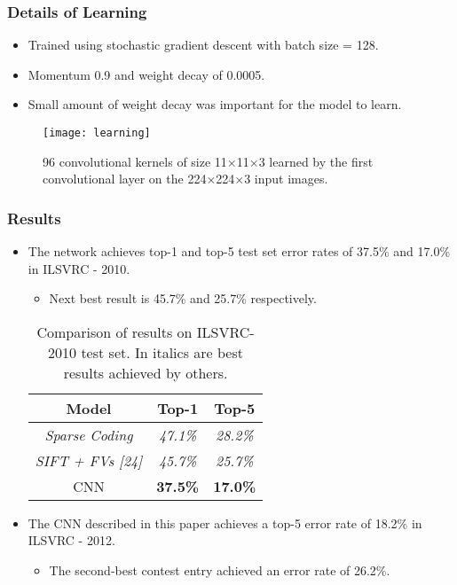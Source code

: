 \documentclass[aspectratio=169, 10pt]{beamer}
\begin{document}
\begin{frame}
	\frametitle{Details of Learning}
	\begin{itemize}
		\item Trained using stochastic gradient descent with batch size = 128.
		\item Momentum 0.9 and weight decay of 0.0005.
		\item Small amount
of weight decay was important for the model to learn.
		
	\end{itemize}
	\begin{figure}
		\texttt{[image: learning]}
		\centering
		\caption{96 convolutional kernels of size
11×11×3 learned by the first convolutional
layer on the 224×224×3 input images.}
	\end{figure}

\end{frame}

\begin{frame}
	\frametitle{Results}
	\begin{itemize}
		\item The network achieves top-1 and top-5 test set error rates of 37.5\% and 17.0\% in ILSVRC - 2010.
		\begin{itemize}
			\item Next best result is  45.7\% and 25.7\% respectively.
		\end{itemize}
		\vspace{8pt}
		
		\begin{center}
		\begin{table}
		\begin{tabular}{||c| c| c||} 
	 	\hline
 		\textbf{Model} & \textbf{Top-1} & \textbf{Top-5} \\ [0.5ex] 
 		\hline\hline
 		\textit{Sparse Coding} & \textit{47.1\%} & \textit{28.2\%}\\ 
 		\hline
 		\textit{SIFT + FVs [24]} & \textit{45.7\%} & \textit{25.7\%} \\
 		\hline
 		CNN & \textbf{37.5\%} & \textbf{17.0\%}\\
 		\hline
 	\end{tabular}
 	\caption{Comparison of results on ILSVRC-2010 test set. In italics are best results
achieved by others.}
	\end{table}
	\end{center}

		\item The CNN described in this paper achieves
a top-5 error rate of 18.2\% in ILSVRC - 2012.
		\begin{itemize}
			\item The second-best contest entry achieved an error rate of 26.2\%.
		\end{itemize}
	\end{itemize}

\end{frame}
\end{document}
